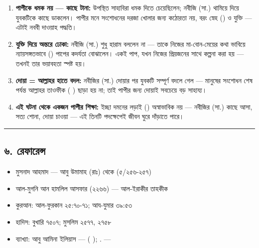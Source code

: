 \begin{enumerate}
\item \textbf{পাপীকে ধমক নয় — কাছে টানা:} উপস্থিত সাহাবিরা ধমক দিতে চেয়েছিলেন; নবীজি (সা.) থামিয়ে দিয়ে যুবকটিকে কাছে ডাকলেন। পাপীর মনে সংশোধনের দরজা খোলার জন্য কঠোরতা নয়, বরং স্নেহ () ও যুক্তি — এটাই নববী দাওয়াহ পদ্ধতি।
\item \textbf{যুক্তি দিয়ে অন্তরে ঢোকা:} নবীজি (সা.) শুধু হারাম বললেন না — তাকে নিজের মা-বোন-মেয়ের কথা ভাবিয়ে ন্যায়সঙ্গতভাবে () পাপের কদর্যতা বোঝালেন। একই পাপ, যখন নিজের প্রিয়জনের সাথে কল্পনা করা হয় — তখনই তার ভয়াবহতা স্পষ্ট হয়।
\item \textbf{দোয়া = আল্লাহর হাতে বদল:} নবীজির (সা.) দোয়ার পর যুবকটি সম্পূর্ণ বদলে গেল — মানুষের সংশোধন শেষ পর্যন্ত আল্লাহর তাওফীক ( ) ছাড়া হয় না; তাই পাপীর জন্য দোয়াই সবচেয়ে বড় সাহায্য।
\item \textbf{এই ঘটনা থেকে একজন পাপীর শিক্ষা:} ইচ্ছা দমনের লড়াই () অস্বাভাবিক নয় — নবীজির (সা.) কাছে আসা, সত্য শোনা, দোয়া চাওয়া — এই তিনটি পদক্ষেপেই জীবন ঘুরে দাঁড়াতে পারে।
\end{enumerate}
\medskip\hrule\medskip

\subsection*{৬. রেফারেন্স}

\begin{itemize}
\item মুসনাদ আহমাদ — আবু উমামাহ (রাঃ) থেকে (৫/২৫৬-২৫৭)
\item আল-মুগনি আন হামলিল আসফার (২২৬৬) — আল-ইরাকীর তাহকীক
\item কুরআন: আল-ফুরকান ২৫:৭০-৭১; আয-যুমার ৩৯:৫৩
\item হাদিস: বুখারি ৭৫০৭; মুসলিম ২৫৭৭, ২৭৫৮
\item ব্যাখ্যা: আবু আমিনা ইলিয়াস —  ( ); . —  
\end{itemize}


